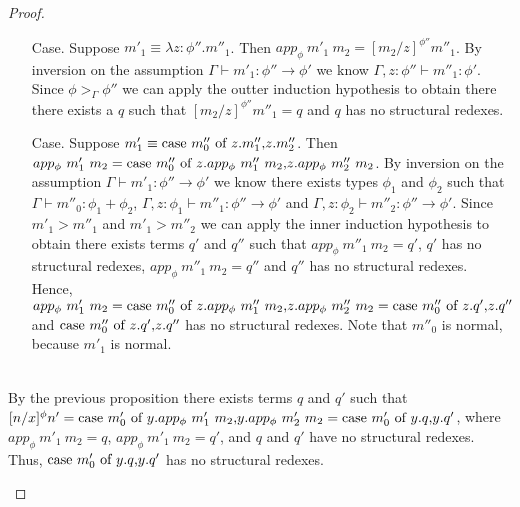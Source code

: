 \begin{proof}
\begin{itemize}
\begin{itemize}
  \item[Case.] Suppose $m'_1 \equiv \lambda z:\phi''.m''_1$.  Then $app_\phi\ m'_1\ m_2 = [m_2/z]^{\phi''} m''_1$.
    By inversion on the assumption $\Gamma \vdash m'_1:\phi'' \to \phi'$ we know 
    $\Gamma,z:\phi'' \vdash m''_1:\phi'$.  Since $\phi >_{\Gamma} \phi''$ we can apply the outter induction
    hypothesis to obtain there there exists a $q$ such that $[m_2/z]^{\phi''} m''_1 = q$ and 
    $q$ has no structural redexes.
    
  \item[Case.] Suppose $m'_1 \equiv \mbox{case}\ m''_0\ \text{of}\ z\text{.}m''_1\text{,}z\text{.}m''_2$.  Then\\
    $app_\phi\ m'_1\ m_2 = \mbox{case}\ m''_0\ \text{of}\ z\text{.}app_\phi\ m''_1\ m_2\text{,}z\text{.}app_\phi\ m''_2\ m_2$.  By inversion on the assumption
    $\Gamma \vdash m'_1:\phi''\to\phi'$ we know there exists types $\phi_1$ and $\phi_2$ such that
    $\Gamma \vdash m''_0:\phi_1+\phi_2$, $\Gamma,z:\phi_1 \vdash m''_1:\phi''\to\phi'$
    and $\Gamma,z:\phi_2 \vdash m''_2:\phi''\to\phi'$.  Since $m'_1 > m''_1$ and $m'_1 > m''_2$ we can 
    apply the inner induction hypothesis to obtain there exists terms $q'$ and $q''$ such that 
    $app_\phi\ m''_1\ m_2 = q'$, $q'$ has no structural redexes, $app_\phi\ m''_1\ m_2 = q''$ and $q''$ has no structural redexes.  
    Hence, 
    $app_\phi\ m'_1\ m_2 = \ccon{m''_0}{z}{app_\phi\ m''_1\ m_2}{app_\phi\ m''_2\ m_2} = \ccon{m''_0}{z}{q'}{q''}$ and
    $\mbox{case}\ m''_0\ \text{of}\ z\text{.}q'\text{,}z\text{.}q''$ has no structural redexes.  Note that $m''_0$ is normal, because $m'_1$ is
    normal.  
  \end{itemize}

  
  \ \\
  By the previous proposition there exists terms $q$ and $q'$ such that \\
  $[n/x]^\phi n' = \ccon{m'_0}{y}{app_\phi\ m'_1\ m_2}{app_\phi\ m'_2\ m_2}
  = \ccon{m'_0}{y}{q}{q'}$, where $app_\phi\ m'_1\ m_2 = q$, $app_\phi\ m'_1\ m_2 = q'$, and
  $q$ and $q'$ have no structural redexes.  Thus, $\mbox{case}\ m'_0\ \text{of}\ y\text{.}q\text{,}y\text{.}q'$ has no
  structural redexes.  
  

\end{itemize}
\end{proof}
